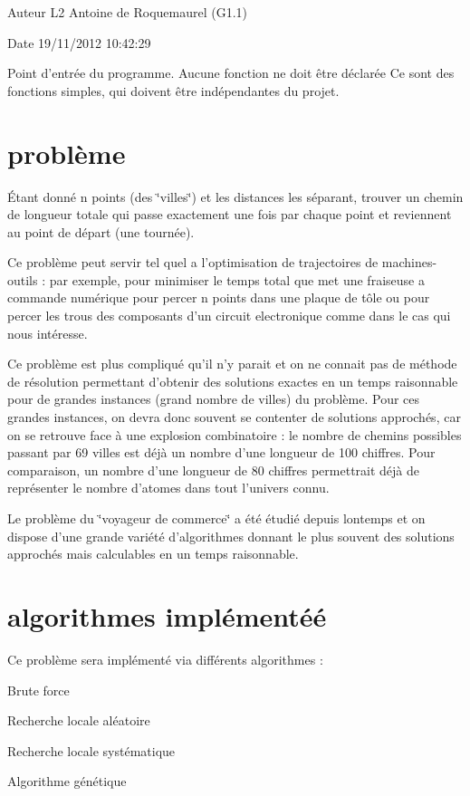 \begin{DoxyAuthor}{Auteur}
L2 Antoine de Roquemaurel (G1.1) 
\end{DoxyAuthor}
\begin{DoxyDate}{Date}
19/11/2012 10:42:29
\end{DoxyDate}
Point d'entrée du programme. Aucune fonction ne doit être déclarée Ce sont des fonctions simples, qui doivent être indépendantes du projet.\hypertarget{main_Le}{}\section{problème}\label{main_Le}
Étant donné n points (des \char`\"{}villes\char`\"{}) et les distances les séparant, trouver un chemin de longueur totale qui passe exactement une fois par chaque point et reviennent au point de départ (une tournée).

Ce problème peut servir tel quel a l'optimisation de trajectoires de machines-\/outils : par exemple, pour minimiser le temps total que met une fraiseuse a commande numérique pour percer n points dans une plaque de tôle ou pour percer les trous des composants d'un circuit electronique comme dans le cas qui nous intéresse.

Ce problème est plus compliqué qu'il n'y parait et on ne connait pas de méthode de résolution permettant d'obtenir des solutions exactes en un temps raisonnable pour de grandes instances (grand nombre de villes) du problème. Pour ces grandes instances, on devra donc souvent se contenter de solutions approchés, car on se retrouve face à une explosion combinatoire : le nombre de chemins possibles passant par 69 villes est déjà un nombre d’une longueur de 100 chiffres. Pour comparaison, un nombre d'une longueur de 80 chiffres permettrait déjà de représenter le nombre d'atomes dans tout l'univers connu.

Le problème du \char`\"{}voyageur de commerce\char`\"{} a été étudié depuis lontemps et on dispose d’une grande variété d'algorithmes donnant le plus souvent des solutions approchés mais calculables en un temps raisonnable.\hypertarget{main_Les}{}\section{algorithmes implémentéé}\label{main_Les}
Ce problème sera implémenté via différents algorithmes :
\begin{DoxyItemize}
\item Brute force
\item Recherche locale aléatoire
\item Recherche locale systématique
\item Algorithme génétique 
\end{DoxyItemize}